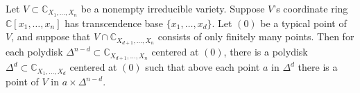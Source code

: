 Let $V \subset \mathbb{C}_{X_1, \ldots, X_n}$ be a nonempty irreducible variety. Suppose $V$'s coordinate ring $\mathbb{C}[x_1, \ldots, x_n]$ has transcendence base $\{x_1, \ldots, x_d\}$. Let $(0)$ be a typical point of $V$, and suppose that $V \cap \mathbb{C}_{X_{d+1}, \ldots, X_n}$ consists of only finitely many points. Then for each polydisk $\Delta^{n-d} \subset \mathbb{C}_{X_{d+1}, \ldots, X_n}$ centered at $(0)$, there is a polydisk $\Delta^d \subset \mathbb{C}_{X_1, \ldots, X_d}$ centered at $(0)$ such that above each point $a$ in $\Delta^d$ there is a point of $V$ in $a \times \Delta^{n-d}$.

